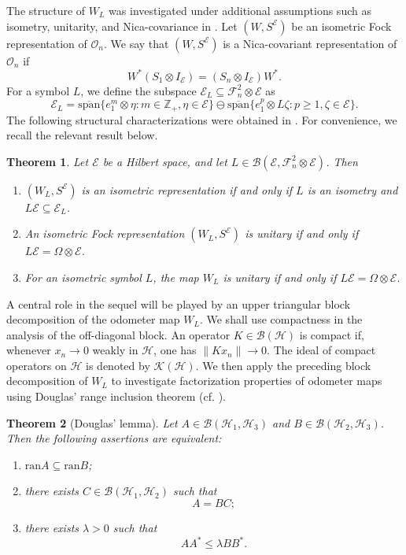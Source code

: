 \documentclass[12pt]{amsart}
\newtheorem{theorem}{Theorem}[section]
\theoremstyle{definition}
\theoremstyle{remark}
\def \Z{\mathbb{Z}}
\newcommand{\clb}{\mathcal{B}}
\newcommand{\cle}{\mathcal{E}}
\newcommand{\clh}{\mathcal{H}}
\newcommand{\clk}{\mathcal{K}}
\newcommand{\clf}{\mathcal{F}}
\newcommand{\clo}{\mathcal{O}}
\newcommand{\ran}{\mathrm{ran}}
\newcommand{\ol}{\overline}
\numberwithin{equation}{section}
\begin{document}
The structure of $W_L$ was investigated under additional assumptions such as isometry, unitarity, and Nica-covariance in \cite{mansi2025}.
Let $(W, S^\cle)$ be an isometric Fock representation of $\clo_n$. We say that $(W, S^\cle)$ is a Nica-covariant representation of $\clo_n$ if 
$$W^*(S_1 \otimes I_\cle) = (S_n \otimes I_\cle)W^*.$$
For a symbol $L$, we define the subspace $\cle_L \subseteq \clf_n^2 \otimes \cle$ as
\begin{equation} \label{eq:EL}
\cle_{L} = \ol{\text{span}}\{e_{1}^{ m}\otimes\eta : m\in\Z_{+},\eta\in\cle\} \ominus \ol{\text{span}}\{e_{1}^{ p}\otimes L\zeta : p\geq 1,\zeta\in\cle\}.
\end{equation}
The following structural characterizations were obtained in \cite[Theorem 4.4]{mansi2025}. For convenience, we recall the relevant result below.
\begin{theorem}\label{thm:fock_classification}
Let $\cle$ be a Hilbert space, and let $L \in \clb(\cle, \clf_n^2 \otimes \cle)$. Then
\begin{enumerate}
    \item $(W_L, S^\cle)$ is an isometric representation if and only if $L$ is an isometry and $L\cle \subseteq \cle_L$.
    \item An isometric Fock representation \((W_L,S^\cle)\) is unitary if and only if
\(L\cle=\Omega\otimes\cle\).
    \item For an isometric symbol $L$, the map $W_L$ is unitary if and only if $L\cle = \Omega \otimes \cle$.
\end{enumerate}
\end{theorem}


A central role in the sequel will be played by an upper triangular block decomposition of the odometer map $W_L$.
We shall use compactness in the analysis of the off-diagonal block. An operator $K\in\clb(\clh)$ is compact if, whenever $x_n\to 0$ weakly in $\clh$, one has $\|Kx_n\|\to 0.$
The ideal of compact operators on $\clh$ is denoted by $\clk(\clh)$. We then apply the preceding block decomposition of $W_L$ to investigate factorization properties of odometer maps using Douglas' range inclusion theorem (cf. \cite{Douglas1966}). 
\begin{theorem}[Douglas' lemma]\label{thm:douglas_lemma}
Let \(A\in \clb(\clh_1,\clh_3)\) and
\(B\in \clb(\clh_2,\clh_3)\). Then the following assertions are equivalent:
\begin{enumerate}
    \item \(\ran A\subseteq \ran B\);
    \item there exists \(C\in \clb(\clh_1,\clh_2)\) such that
    \[
    A=BC;
    \]
    \item there exists \(\lambda>0\) such that
    \[
    AA^*\leq \lambda BB^*.
    \]
\end{enumerate}
\end{theorem}
\end{document}
